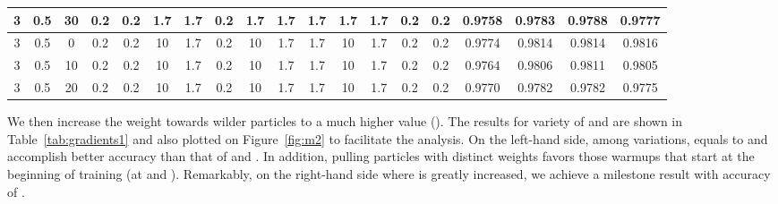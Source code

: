 \documentclass{ieeeaccess}
\begin{document}
\begin{table*}
{\begin{tabular}{|c|c|c|c|c|c|c|c|c|c|c|c|c|c|c|c|c|c|c|}
\hline
3 & 0.5                   & 30     & 0.2                     & 0.2                     & 1.7                     & 1.7                     & 0.2                     & 1.7                     & 1.7                     & 1.7                     & 1.7                     & 1.7                     & 0.2                     & 0.2 & \textcolor[rgb]{0.122,0.122,0.129}{0.9758} & \textcolor[rgb]{0.122,0.122,0.129}{0.9783} & \textcolor[rgb]{0.122,0.122,0.129}{0.9788} & \textcolor[rgb]{0.122,0.122,0.129}{0.9777}  \\ 
\hline
3 & 0.5                   & 0      & 0.2                     & 0.2                     & 10                      & 1.7                     & 0.2                     & 10                      & 1.7                     & 1.7                     & 10                      & 1.7                     & 0.2                     & 0.2 & \textcolor[rgb]{0.122,0.122,0.129}{0.9774} & \textcolor[rgb]{0.122,0.122,0.129}{0.9814} & \textcolor[rgb]{0.122,0.122,0.129}{0.9814} & \textcolor[rgb]{0.122,0.122,0.129}{0.9816}  \\ 
\hline
3 & 0.5                   & 10     & 0.2                     & 0.2                     & 10                      & 1.7                     & 0.2                     & 10                      & 1.7                     & 1.7                     & 10                      & 1.7                     & 0.2                     & 0.2 & \textcolor[rgb]{0.122,0.122,0.129}{0.9764} & \textcolor[rgb]{0.122,0.122,0.129}{0.9806} & \textcolor[rgb]{0.122,0.122,0.129}{0.9811} & \textcolor[rgb]{0.122,0.122,0.129}{0.9805}  \\ 
\hline
3 & 0.5                   & 20     & 0.2                     & 0.2                     & 10                      & 1.7                     & 0.2                     & 10                      & 1.7                     & 1.7                     & 10                      & 1.7                     & 0.2                     & 0.2 & \textcolor[rgb]{0.122,0.122,0.129}{0.9770} & \textcolor[rgb]{0.122,0.122,0.129}{0.9782} & \textcolor[rgb]{0.122,0.122,0.129}{0.9782} & \textcolor[rgb]{0.122,0.122,0.129}{0.9775}  \\
\hline
\end{tabular}
}
\end{table*} 

We then increase the weight towards wilder particles to a much higher value (). The results for variety of  and  are shown in Table~\ref{tab:gradients1} and also plotted on Figure~\ref{fig:m2} to facilitate the analysis. On the left-hand side, among variations,  equals to  and  accomplish better accuracy than that of  and . In addition, pulling particles with distinct weights favors those warmups that start at the beginning of training (at  and ). Remarkably, on the right-hand side where  is greatly increased, we achieve a milestone result with accuracy of .
\end{document}
